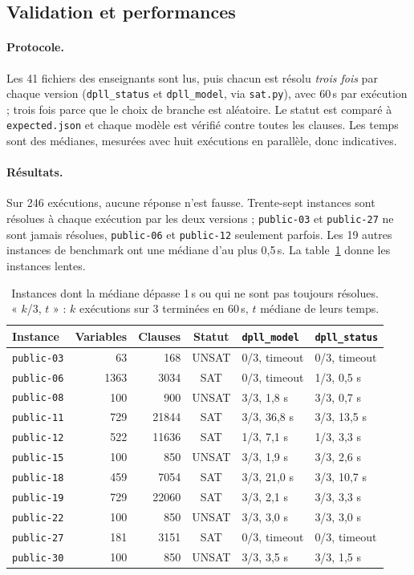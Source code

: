\documentclass[11pt,a4paper]{article}
\begin{document}
\subsection{Validation et performances}

\paragraph{Protocole.} Les 41 fichiers des enseignants sont lus, puis chacun est résolu \emph{trois fois} par chaque version (\texttt{dpll\_status} et \texttt{dpll\_model}, via \texttt{sat.py}), avec 60\,s par exécution ; trois fois parce que le choix de branche est aléatoire. Le statut est comparé à \texttt{expected.json} et chaque modèle est vérifié contre toutes les clauses. Les temps sont des médianes, mesurées avec huit exécutions en parallèle, donc indicatives.

\paragraph{Résultats.} Sur 246 exécutions, aucune réponse n'est fausse. Trente-sept instances sont résolues à chaque exécution par les deux versions ; \texttt{public-03} et \texttt{public-27} ne sont jamais résolues, \texttt{public-06} et \texttt{public-12} seulement parfois. Les 19 autres instances de benchmark ont une médiane d'au plus 0{,}5\,s. La table~\ref{tab:q2} donne les instances lentes.
\begin{table}[H]
\centering\small
\begin{tabular}{@{}lrrcll@{}}
\toprule
Instance & Variables & Clauses & Statut & \texttt{dpll\_model} & \texttt{dpll\_status}\\
\midrule
\texttt{public-03} & 63 & 168 & UNSAT & 0/3, timeout & 0/3, timeout\\
\texttt{public-06} & 1363 & 3034 & SAT & 0/3, timeout & 1/3, 0,5 s\\
\texttt{public-08} & 100 & 900 & UNSAT & 3/3, 1,8 s & 3/3, 0,7 s\\
\texttt{public-11} & 729 & 21844 & SAT & 3/3, 36,8 s & 3/3, 13,5 s\\
\texttt{public-12} & 522 & 11636 & SAT & 1/3, 7,1 s & 1/3, 3,3 s\\
\texttt{public-15} & 100 & 850 & UNSAT & 3/3, 1,9 s & 3/3, 2,6 s\\
\texttt{public-18} & 459 & 7054 & SAT & 3/3, 21,0 s & 3/3, 10,7 s\\
\texttt{public-19} & 729 & 22060 & SAT & 3/3, 2,1 s & 3/3, 3,3 s\\
\texttt{public-22} & 100 & 850 & UNSAT & 3/3, 3,0 s & 3/3, 3,0 s\\
\texttt{public-27} & 181 & 3151 & SAT & 0/3, timeout & 0/3, timeout\\
\texttt{public-30} & 100 & 850 & UNSAT & 3/3, 3,5 s & 3/3, 1,5 s\\
\bottomrule
\end{tabular}
\caption{Instances dont la médiane dépasse 1\,s ou qui ne sont pas toujours résolues. « $k$/3, $t$ » : $k$ exécutions sur 3 terminées en 60\,s, $t$ médiane de leurs temps.}
\label{tab:q2}
\end{table}
\end{document}
